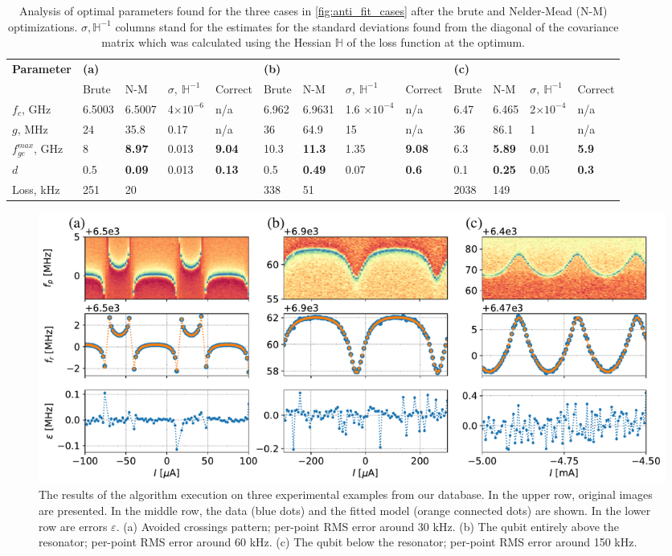 \documentclass[%
 aip,
 draft,
 amsmath,amssymb,
 reprint,%
]{revtex4-1}
\begin{document}
\begin{table}
	\centering
	\begin{ruledtabular}
		\renewcommand{\arraystretch}{1.2}

		\begin{tabular}{*{13}{l}} 
			\multirow{2}{*}{\textbf{Parameter}} & 
			\multicolumn{4}{l}{\textbf{(a)}} & 
			\multicolumn{4}{l}{\textbf{(b)}} & \multicolumn{4}{l}{\textbf{(c)}}\\
			& Brute & N-M & $\sigma,\ \mathbb{H}^{-1}$ & Correct  & Brute & N-M & $\sigma,\ \mathbb{H}^{-1}$ & Correct  & Brute& N-M & $\sigma,\ \mathbb{H}^{-1}$ & Correct  \\
			\hline
			$f_c$, GHz &6.5003 & 6.5007 &  4$\times 10^{-6}$ & n/a & 6.962 & 6.9631 & 1.6 $\times 10^{-4}$  & n/a &  6.47 & 6.465& 2$\times 10^{-4}$ & n/a\\ 
			$g$, MHz & 24 & 35.8 & 0.17 & n/a & 36 & 64.9 & 15 & n/a & 36 & 86.1& 1 &n/a\\
			$f_{ge}^{max}$, GHz & 8 &\textbf{8.97} & 0.013 & \textbf{9.04} &10.3& \textbf{11.3}& 1.35 & \textbf{9.08}& 6.3& \textbf{5.89}&0.01&\textbf{5.9}\\
			$d$ &0.5& \textbf{0.09}& 0.013& \textbf{0.13} &0.5&\textbf{0.49} &0.07&\textbf{0.6}&0.1& \textbf{0.25} & 0.05 &\textbf{0.3} \\\hline
			Loss, kHz & 251 & 20 && &338& 51 & & &2038& 149&&
		\end{tabular} 
	\end{ruledtabular}
	\caption{Analysis of optimal parameters found for the three cases in \autoref{fig:anti_fit_cases} after the brute and Nelder-Mead (N-M) optimizations. $\sigma, \mathbb{H}^{-1}$ columns stand for the estimates for the standard deviations found from the diagonal of the covariance matrix which was calculated using the Hessian $\mathbb{H}$ of the loss function at the optimum.}
	\label{tab:sts_results}
\end{table}

\begin{figure}
	\centering
	\includegraphics[width=\linewidth]{fit_cases}
	\caption{The results of the algorithm execution on three experimental examples from our database. In the upper row, original images are presented. In the middle row, the data  (blue dots) and the fitted model (orange connected dots) are shown. In the lower row are errors $\varepsilon$. (a) Avoided crossings pattern; per-point RMS error around 30 kHz. (b) The qubit entirely above the resonator; per-point RMS error around 60 kHz. (c) The qubit below the resonator; per-point RMS error around 150 kHz.}
	\label{fig:anti_fit_cases}
\end{figure}
\end{document}

